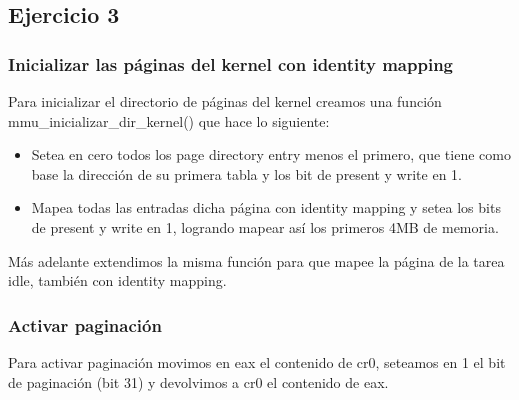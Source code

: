 \subsection{Ejercicio 3}

\subsubsection{Inicializar las páginas del kernel con identity mapping}

Para inicializar el directorio de páginas del kernel creamos una función mmu_inicializar_dir_kernel() que hace lo siguiente:

\begin{itemize}
	\item Setea en cero todos los page directory entry menos el primero, que tiene como base la dirección de su primera tabla y los bit de present y write en 1.
	\item Mapea todas las entradas dicha página con identity mapping y setea los bits de present y write en 1, logrando mapear así los primeros 4MB de memoria.
\end{itemize}

Más adelante extendimos la misma función para que mapee la página de la tarea idle, también con identity mapping.

\subsubsection{Activar paginación}

Para activar paginación movimos en eax el contenido de cr0, seteamos en 1 el bit de paginación (bit 31) y devolvimos a cr0 el contenido de eax.